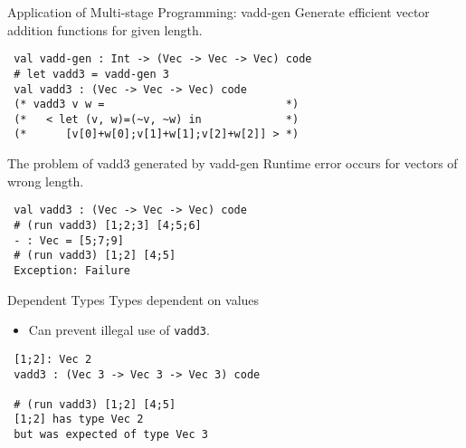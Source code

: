 \documentclass[dvipdfmx,aspectratio=169, 20pt]{beamer}
\renewcommand{\V}{\vdash}
\begin{document}
\begin{frame}[fragile]{Application of Multi-stage Programming: vadd-gen}
    Generate efficient vector addition functions for given length.
    \begin{exampleblock}{}
    \begin{verbatim}
 val vadd-gen : Int -> (Vec -> Vec -> Vec) code
 # let vadd3 = vadd-gen 3
 val vadd3 : (Vec -> Vec -> Vec) code
 (* vadd3 v w =                            *)
 (*   < let (v, w)=(~v, ~w) in             *)
 (*      [v[0]+w[0];v[1]+w[1];v[2]+w[2]] > *)
    \end{verbatim}
    \end{exampleblock}
    \note{
    }
\end{frame}

\begin{frame}[fragile]{The problem of vadd3 generated by vadd-gen}
    Runtime error occurs for vectors of wrong length.
    \begin{exampleblock}{}
    \begin{verbatim}
 val vadd3 : (Vec -> Vec -> Vec) code
 # (run vadd3) [1;2;3] [4;5;6]
 - : Vec = [5;7;9]
 # (run vadd3) [1;2] [4;5]
 Exception: Failure
    \end{verbatim}
    \end{exampleblock}
    \note{
    }
\end{frame}

\begin{frame}[fragile]{Dependent Types}
    \renewcommand{\V}{\text{Vec}\ }
    Types dependent on values
    \begin{itemize}
        \item Can prevent illegal use of {\verb|vadd3|}.
    \end{itemize}
    \begin{exampleblock}{}
 \begin{verbatim}
 [1;2]: Vec 2
 vadd3 : (Vec 3 -> Vec 3 -> Vec 3) code

 # (run vadd3) [1;2] [4;5]
 [1;2] has type Vec 2
 but was expected of type Vec 3
 \end{verbatim}
    \end{exampleblock}
\end{frame}
\end{document}
